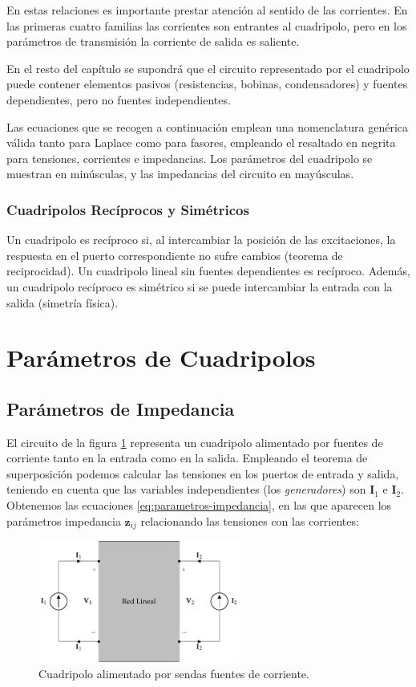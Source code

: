 En estas relaciones es importante prestar atención al sentido de las corrientes. En las primeras cuatro familias las corrientes son entrantes al cuadripolo, pero en los parámetros de transmisión la corriente de salida es saliente.

En el resto del capítulo se supondrá que el circuito representado por el cuadripolo puede contener elementos pasivos (resistencias, bobinas, condensadores) y fuentes dependientes, pero no fuentes independientes.

Las ecuaciones que se recogen a continuación emplean una nomenclatura genérica válida tanto para Laplace como para fasores, empleando el resaltado en negrita para tensiones, corrientes e impedancias. Los parámetros del cuadripolo se muestran en minúsculas, y las impedancias del circuito en mayúsculas.

\subsubsection{Cuadripolos Recíprocos y Simétricos}

Un cuadripolo es recíproco si, al intercambiar la posición de las excitaciones, la respuesta en el puerto correspondiente no sufre cambios (teorema de reciprocidad). Un cuadripolo lineal sin fuentes dependientes es recíproco. Además, un cuadripolo recíproco es simétrico si se puede intercambiar la entrada con la salida (simetría física).

\section{Parámetros de Cuadripolos}

\subsection{Parámetros de Impedancia}
\label{sec:impedancia}

El circuito de la figura \ref{fig:cuadripolo-impedancia} representa un cuadripolo alimentado por fuentes de corriente tanto en la entrada como en la salida. Empleando el teorema de superposición podemos calcular las tensiones en los puertos de entrada y salida, teniendo en cuenta que las variables independientes (los \emph{generadores}) son \(\mathbf{I}_1\) e \(\mathbf{I}_2\). Obtenemos las ecuaciones \ref{eq:parametros-impedancia}, en las que aparecen los parámetros impedancia $\mathbf{z}_{ij}$ relacionando las tensiones con las corrientes: 

\begin{figure}[H]
  \centering
  \includegraphics[height=4cm]{../figs/cuadripolo_fuentes_corriente.pdf}
  \caption{Cuadripolo alimentado por sendas fuentes de corriente.}
  \label{fig:cuadripolo-impedancia}
\end{figure}


